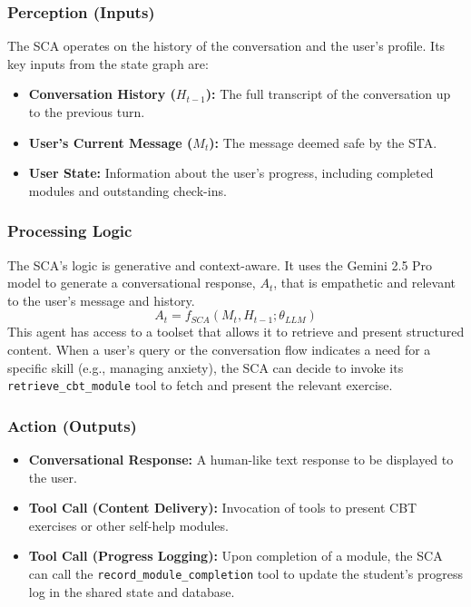 \subsubsection{Perception (Inputs)}
The SCA operates on the history of the conversation and the user's profile. Its key inputs from the state graph are:
\begin{itemize}
    \item \textbf{Conversation History ($H_{t-1}$):} The full transcript of the conversation up to the previous turn.
    \item \textbf{User's Current Message ($M_t$):} The message deemed safe by the STA.
    \item \textbf{User State:} Information about the user's progress, including completed modules and outstanding check-ins.
\end{itemize}

\subsubsection{Processing Logic}
The SCA's logic is generative and context-aware. It uses the Gemini 2.5 Pro model to generate a conversational response, $A_t$, that is empathetic and relevant to the user's message and history.
$$ A_t = f_{SCA}(M_t, H_{t-1}; \theta_{LLM}) $$
This agent has access to a toolset that allows it to retrieve and present structured content. When a user's query or the conversation flow indicates a need for a specific skill (e.g., managing anxiety), the SCA can decide to invoke its \texttt{retrieve\_cbt\_module} tool to fetch and present the relevant exercise.

\subsubsection{Action (Outputs)}
\begin{itemize}
    \item \textbf{Conversational Response:} A human-like text response to be displayed to the user.
    \item \textbf{Tool Call (Content Delivery):} Invocation of tools to present CBT exercises or other self-help modules.
    \item \textbf{Tool Call (Progress Logging):} Upon completion of a module, the SCA can call the \texttt{record\_module\_completion} tool to update the student's progress log in the shared state and database.
\end{itemize}

